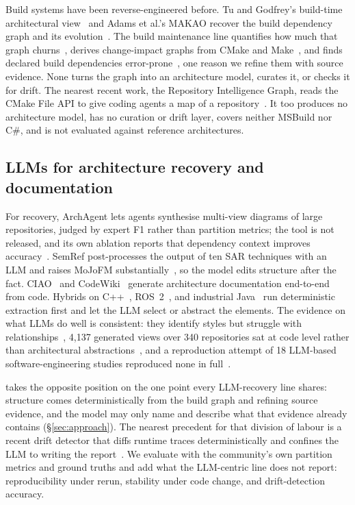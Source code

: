 Build systems have been reverse-engineered before. Tu and
Godfrey's build-time architectural view~\cite{tu2001buildtime} and Adams et al.'s MAKAO recover
the build dependency graph and its evolution~\cite{adams2007makao,adams2008linuxbuild}. The build
maintenance line quantifies how much that graph
churns~\cite{mcintosh2011buildeffort,mcintosh2012javabuild,nejati2024buildchanges}, derives
change-impact graphs from CMake and Make~\cite{meidani2023dipidi}, and finds declared build
dependencies error-prone~\cite{lyu2024builddeps}, one reason we refine them with source evidence.
None turns the graph into an architecture model, curates it, or checks it for drift. The nearest recent work, the Repository Intelligence Graph, reads the CMake File API to
give coding agents a map of a repository~\cite{chernyshahar2026rig}. It too produces no
architecture model, has no curation or drift layer, covers neither MSBuild nor C\#, and is not
evaluated against reference architectures.

\subsection{LLMs for architecture recovery and documentation}

For recovery, ArchAgent lets agents synthesise multi-view diagrams of large repositories, judged
by expert F1 rather than partition metrics; the tool is not released, and its own ablation reports
that dependency context improves accuracy~\cite{archagent}. SemRef post-processes the output of
ten SAR techniques with an LLM and raises MoJoFM substantially~\cite{zhang2026semref}, so the
model edits structure after the fact. CIAO~\cite{deluca2026ciao} and CodeWiki~\cite{codewiki2026}
generate architecture documentation end-to-end from code. Hybrids on C++~\cite{hatahet2025sad},
ROS~2~\cite{benchat2026ros2}, and industrial Java~\cite{rukmono2026dsar} run deterministic
extraction first and let the LLM select or abstract the elements. The evidence on what LLMs do
well is consistent: they identify styles but struggle with
relationships~\cite{amalfitano2025recovery}, 4{,}137 generated views over 340 repositories sat at
code level rather than architectural abstractions~\cite{sathvika2026views}, and a reproduction
attempt of 18 LLM-based software-engineering studies reproduced none in
full~\cite{angermeir2026reproducibility}.

\tool{} takes the opposite position on the one point every LLM-recovery line shares: structure
comes deterministically from the build graph and refining source evidence, and the model may only
name and describe what that evidence already contains (\S\ref{sec:approach}). The nearest
precedent for that division of labour is a recent drift detector that diffs runtime traces
deterministically and confines the LLM to writing the report~\cite{deangelis2026drift}. We
evaluate with the community's own partition metrics and ground truths and add what the
LLM-centric line does not report: reproducibility under rerun, stability under code change, and
drift-detection accuracy.

